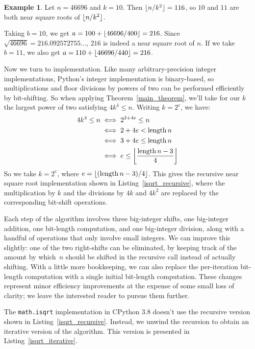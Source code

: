 \documentclass[a4paper]{article}
\DeclarePairedDelimiter\floor{\lfloor}{\rfloor}
\DeclareMathOperator{\length}{length}
\theoremstyle{plain}
\theoremstyle{definition}
\newtheorem{example}[theorem]{Example}
\begin{document}
\begin{example}
  Let $n = 46696$ and $k=10$. Then $\floor{n / k^2} = 116$, so $10$ and
  $11$ are both near square roots of $\floor{n / k^2}$.

  Taking $b = 10$, we get $a = 100 + \floor{46696 / 400} = 216$. Since
  $\sqrt{46696} = 216.092572755\dots$, $216$ is indeed a near square root of
  $n$. If we take $b = 11$, we also get $a = 110 + \floor{46696 / 440} = 216$.
\end{example}

Now we turn to implementation. Like many arbitrary-precision integer
implementations, Python's integer implementation is binary-based, so
multiplications and floor divisions by powers of two can be performed
efficiently by bit-shifting. So when applying Theorem~\ref{main_theorem}, we'll
take for our $k$ the largest power of two satisfying $4k^4 \le n$. Writing
$k=2^e$, we have:
\begin{align*}
  4k^4 \le n
  &\iff 2^{2 + 4e} \le n \\
  &\iff 2 + 4e < \length n \\
  &\iff 3 + 4e \le \length n \\
  &\iff e \le \floor*{\frac{\length n - 3}{4}}
\end{align*}
So we take $k = 2^e$, where $e={\floor{(\length n - 3)/4}}$. This gives the
recursive near square root implementation shown in
Listing~\ref{isqrt_recursive}, where the multiplication by $k$ and the
divisions by $4k$ and $4k^2$ are replaced by the corresponding bit-shift
operations.



Each step of the algorithm involves three big-integer shifts, one
big-integer addition, one bit-length computation, and one big-integer division,
along with a handful of operations that only involve small integers.
We can improve this slightly: one of the two right-shifts can be eliminated, by
keeping track of the amount by which~$n$ should be shifted in the recursive
call instead of actually shifting. With a little more bookkeeping, we can
also replace the per-iteration bit-length computation with a single
initial bit-length computation. These changes represent minor efficiency
improvements at the expense of some small loss of clarity; we leave the
interested reader to pursue them further.

The \lstinline{math.isqrt} implementation in CPython 3.8 doesn't use the
recursive version shown in Listing~\ref{isqrt_recursive}. Instead, we unwind
the recursion to obtain an iterative version of the algorithm. This version is
presented in Listing~\ref{isqrt_iterative}.
\end{document}
